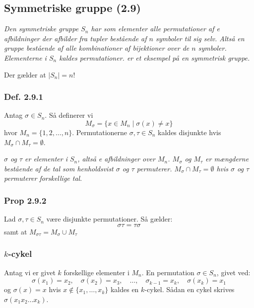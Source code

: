 \subsection{Symmetriske gruppe (2.9)}
\textit{Den symmetriske gruppe $S_n$ har som elementer alle permutationer af
e afbildninger der afbilder fra tupler bestående af $n$
symboler til sig selv. Altså en gruppe bestående af alle kombinationer af
bijektioner over de $n$ symboler. Elementerne i $S_n$ kaldes permutationer.
 er et eksempel på en symmetrisk gruppe.}

Der gælder at $\mid S_n\mid = n!$

\subsubsection{Def. 2.9.1}
Antag $\sigma \in S_n$. Så definerer vi
\begin{equation*}
  M_\sigma = \{x \in M_n \mid \sigma(x) \neq x\}
\end{equation*}
hvor $M_n = \{ 1, 2, \ldots, n \}$. Permutationerne $\sigma, \tau \in S_n$
kaldes disjunkte hvis $M_\sigma \cap M_\tau = \emptyset$.

\textit{$\sigma$ og $\tau$ er elementer i $S_n$, altså e
afbildninger over $M_n$. $M_\sigma$ og $M_\tau$ er mængderne bestående af de
tal som henholdsvist $\sigma$ og $\tau$ permuterer. $M_\sigma \cap M_\tau =
\emptyset$ hvis $\sigma$ og $\tau$ permuterer forskellige tal}.

\subsubsection{Prop 2.9.2}
Lad $\sigma, \tau \in S_n$ være disjunkte permutationer. Så gælder:
\begin{equation*}
  \sigma \tau = \tau \sigma
\end{equation*}
samt at $M_{\sigma\tau} = M_\sigma \cup M_\tau$

\subsubsection{$k$-cykel}
\label{$k$-cykel}
Antag vi er givet $k$ forskellige elementer i $M_n$. En permutation $\sigma \in
S_n$, givet ved:
\begin{equation*}
  \sigma(x_1) = x_2, \quad \sigma(x_2) = x_3, \quad \ldots, \quad \sigma_{k-1} =
  x_k, \quad \sigma(x_k) = x_1
\end{equation*}
og $\sigma(x) = x$ hvis $x \nin \{x_1,\ldots,x_k\}$ kaldes en $k$-cykel. Sådan
en cykel skrives $\sigma(x_1 x_2 \ldots x_k)$.

